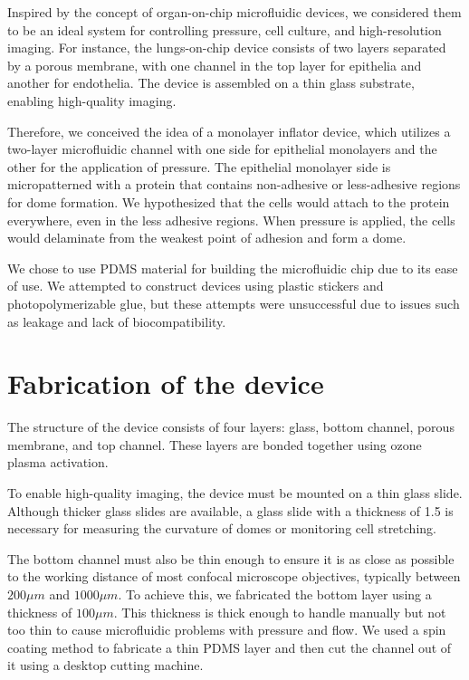 Inspired by the concept of organ-on-chip microfluidic devices, we
considered them to be an ideal system for controlling pressure, cell
culture, and high-resolution imaging. For instance, the lungs-on-chip
device consists of two layers separated by a porous membrane, with one
channel in the top layer for epithelia and another for endothelia. The
device is assembled on a thin glass substrate, enabling high-quality
imaging.

Therefore, we conceived the idea of a monolayer inflator device, which
utilizes a two-layer microfluidic channel with one side for epithelial
monolayers and the other for the application of pressure. The epithelial
monolayer side is micropatterned with a protein that contains
non-adhesive or less-adhesive regions for dome formation. We
hypothesized that the cells would attach to the protein everywhere, even
in the less adhesive regions. When pressure is applied, the cells would
delaminate from the weakest point of adhesion and form a dome.

We chose to use PDMS material for building the microfluidic chip due to
its ease of use. We attempted to construct devices using plastic
stickers and photopolymerizable glue, but these attempts were
unsuccessful due to issues such as leakage and lack of biocompatibility.


\hypertarget{fabrication-of-the-device}{%
\section{Fabrication of the device}\label{fabrication-of-the-device}}

The structure of the device consists of four layers: glass, bottom
channel, porous membrane, and top channel. These layers are bonded
together using ozone plasma activation.

To enable high-quality imaging, the device must be mounted on a thin
glass slide. Although thicker glass slides are available, a glass slide
with a thickness of 1.5 is necessary for measuring the curvature of
domes or monitoring cell stretching.

The bottom channel must also be thin enough to ensure it is as close as
possible to the working distance of most confocal microscope objectives,
typically between \(200\mu m\) and \(1000 \mu m\). To achieve this, we
fabricated the bottom layer using a thickness of \(100 \mu m\). This
thickness is thick enough to handle manually but not too thin to cause
microfluidic problems with pressure and flow. We used a spin coating
method to fabricate a thin PDMS layer and then cut the channel out of it
using a desktop cutting machine.


